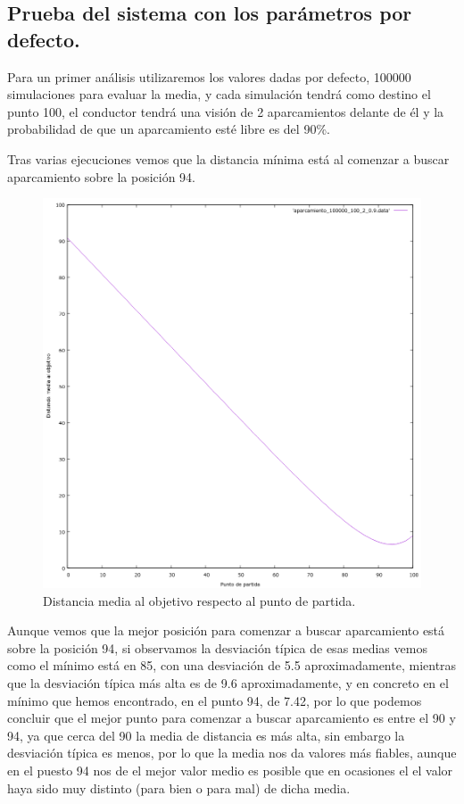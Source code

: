 \documentclass[12pt, spanish]{article}
\begin{document}
\subsection{Prueba del sistema con los parámetros por defecto.}

Para un primer análisis utilizaremos los valores dadas por defecto, 100000 simulaciones para evaluar la media, y cada simulación tendrá como destino el punto 100, el conductor tendrá una visión de 2 aparcamientos delante de él y la probabilidad de que un aparcamiento esté libre es del 90\%.

Tras varias ejecuciones vemos que la distancia mínima está al comenzar a buscar aparcamiento sobre la posición 94.

\begin{figure}[H]
	\centering
	\includegraphics[scale = 0.6]{aparcamiento_100000_100_2_0-9.png}
	\caption{Distancia media al objetivo respecto al punto de partida.}
	\label{fig:ej4}

\end{figure}

Aunque vemos que la mejor posición para comenzar a buscar aparcamiento está sobre la posición 94, si observamos la desviación típica de esas medias vemos como el mínimo está en 85, con una desviación de 5.5 aproximadamente, mientras que la desviación típica más alta es de 9.6 aproximadamente, y en concreto en el mínimo que hemos encontrado, en el punto 94, de 7.42, por lo que podemos concluir que el mejor punto para comenzar a buscar aparcamiento es entre el 90 y 94, ya que cerca del 90 la media de distancia es más alta, sin embargo la desviación típica es menos, por lo que la media nos da valores más fiables, aunque en el puesto 94 nos de el mejor valor medio es posible que en ocasiones el el valor haya sido muy distinto (para bien o para mal) de dicha media.
\end{document}
